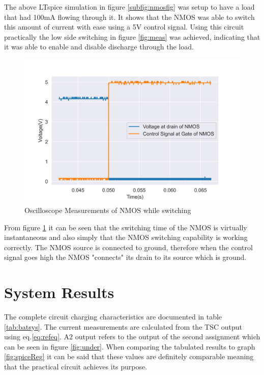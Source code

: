  The above LTspice simulation in figure \ref{subfig:nmosfig} was setup to have a load that had 100mA flowing through it. It shows that the NMOS was able to switch this amount of current with ease using a 5V control signal. Using this circuit practically the low side switching in figure \ref{fig:meas} was achieved, indicating that it was able to enable and disable discharge through the load.


\begin{figure}[!htb]
\centering
\includegraphics[scale=0.6]{./Figures/NMOSmeas}
\caption{Oscilloscope Measurements of NMOS while switching}
\label{fig:measNMOS}
\end{figure}

From figure \ref{fig:measNMOS} it can be seen that the switching time of the NMOS is virtually instantaneous and also simply that the NMOS switching capability is working correctly. The NMOS source is connected to ground, therefore when the control signal goes high the NMOS "connects" its drain to its source which is ground.

\newpage
\section{System Results}
\label{sec:sysRes}
The complete circuit charging characteristics are documented in table \ref{tab:batsys}. The current measurements are calculated from the TSC output using eq.\ref{eq:refeq}. A2 output refers to the output of the second assignment which can be seen in figure \ref{fig:under}. When comparing the tabulated results to graph \ref{fig:spiceReg} it can be said that these values are definitely comparable meaning that the practical circuit achieves its purpose.


